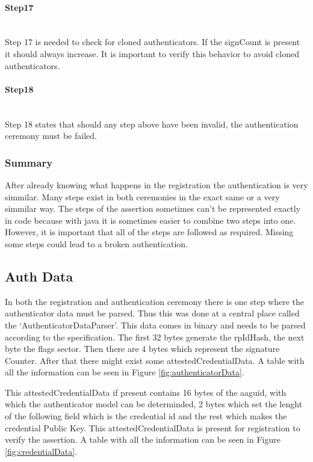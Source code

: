 \documentclass[a4paper, 11pt]{scrartcl}
\begin{document}
\paragraph{Step17}\hfill \\ 
Step 17 is needed to check for cloned authenticators. If the signCount is present it should always increase. It is important to verify this behavior to avoid cloned authenticators.

\paragraph{Step18}\hfill \\ 
Step 18 states that should any step above have been invalid, the authentication ceremony must be failed.

\subsubsection{Summary}
After already knowing what happens in the registration the authentication is very simmilar. Many steps exist in both ceremonies in the exact same or a very simmilar way. The steps of the assertion sometimes can't be represented exactly in code because with java it is sometimes easier to combine two steps into one. However, it is important that all of the steps are followed as required. Missing some steps could lead to a broken authentication.

\subsection{Auth Data}
\label{sec:authData}
In both the registration and authentication ceremony there is one step where the authenticator data must be parsed. Thus this was done at a central place called the `AuthenticatorDataParser'. This data comes in binary and needs to be parsed according to the specification. The first 32 bytes generate the rpIdHash, the next byte the flags sector. Then there are 4 bytes which represent the signature Counter. After that there might exist some attestedCredentialData. A table with all the information can be seen in Figure \ref{fig:authenticatorData}.

This attestedCredentialData if present contains 16 bytes of the aaguid, with which the authenticator model can be determinded, 2 bytes which set the lenght of the following field which is the credential id and the rest which makes the credential Public Key. This attestedCredentialData is present for registration to verify the assertion. A table with all the information can be seen in Figure \ref{fig:credentialData}.
\end{document}
